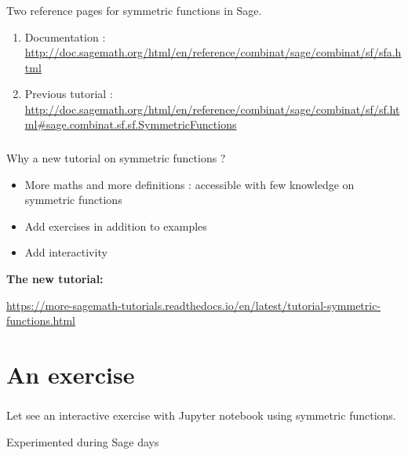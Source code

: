 \documentclass[10pt]{beamer}
\newcommand{\green}[1]{{\color[rgb]{0,0.55,0.25}{#1}}}
\newcommand{\purple}[1]{{\color[rgb]{.7,.2,1}{#1}}}
\begin{document}
\begin{frame}\frametitle{\purple{Tutorial on Symmetric Functions}}

Two reference pages for symmetric functions in Sage. \newline 
\begin{enumerate}
	\item Documentation : \\
	\url{http://doc.sagemath.org/html/en/reference/combinat/sage/combinat/sf/sfa.html} \newline
	 
	\item Previous tutorial : \\
	\url{http://doc.sagemath.org/html/en/reference/combinat/sage/combinat/sf/sf.html#sage.combinat.sf.sf.SymmetricFunctions} \newline
\end{enumerate}

\end{frame}

\begin{frame}\frametitle{\purple{Tutorial on Symmetric Functions}}

Why a new tutorial on symmetric functions ?  \newline

\begin{itemize}
	\item More maths and more definitions : accessible with few knowledge on symmetric functions
	\item Add exercises in addition to examples
	\item Add interactivity \newline
\end{itemize}

\textbf{The new tutorial:} \newline

\centering
\url{https://more-sagemath-tutorials.readthedocs.io/en/latest/tutorial-symmetric-functions.html}

\end{frame}

\section{An exercise}

\begin{frame}\frametitle{\green{Discriminant of a polynomial using symmetric functions}}

Let see an interactive exercise with Jupyter notebook using symmetric functions. 

Experimented during Sage days

\end{frame}
\end{document}
